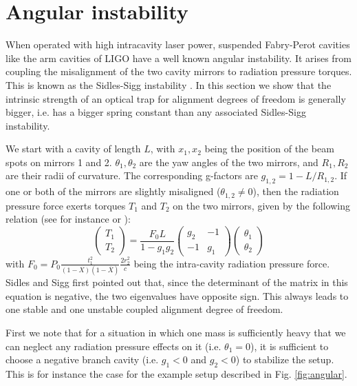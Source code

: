 
\section{Angular instability}
\label{sec:IV} 
When operated with high intracavity laser power, suspended Fabry-Perot cavities like the arm cavities of LIGO have a well known angular instability. It  arises from coupling the misalignment of the two cavity mirrors to radiation pressure torques. This is known as the Sidles-Sigg instability \cite{Sidles06}. In this section we show that the intrinsic strength of an optical trap for alignment degrees of freedom is generally bigger, i.e. has a bigger spring constant than any associated Sidles-Sigg instability. 

We start with a cavity of length $L$, with $x_1,x_2$  being the position of the beam spots on mirrors 1 and 2. $\theta_1,\theta_2$ are the yaw angles of the two mirrors, and $R_1,R_2$ are their radii of curvature. The corresponding g-factors are $g_{1,2}=1-L/R_{1,2}$.
If one or both of the mirrors are slightly misaligned ($\theta_{1,2}\neq 0$), then the radiation pressure force exerts torques $T_1$ and $T_2$ on the two mirrors, given by the following relation (see for instance \cite{Sidles06} or \cite{Ballmer13}): 
\begin{equation}
\label{SidlesSigg_Basic}
\left(
\begin{array}{c}
T_1\\
T_2
\end{array}
\right)
=
\frac{F_0 L}{1-g_1 g_2}
\left(
\begin{array}{cc}
g_2 & -1\\
-1 & g_1
\end{array}
\right)
\left(
\begin{array}{c}
\theta_1\\
\theta_2
\end{array}
\right)
\end{equation} 
with $F_0=P_0\frac{t_1^2}{(1-X)(1-\overline{X})} \frac{2 r_2^2}{c}$ being the intra-cavity radiation pressure force. Sidles and Sigg first pointed out that, since the determinant of the matrix in this equation
 is negative, the two eigenvalues have opposite sign. This always leads to one stable and one unstable coupled alignment degree of freedom.

First we note that for a situation in which one mass is sufficiently heavy that we can neglect any radiation pressure effects on it (i.e. $\theta_1=0$), it is sufficient to choose a negative branch cavity (i.e. $g_1<0$ and $g_2<0$) to stabilize the setup. This is for instance the case for the example setup described in Fig. \ref{fig:angular}.


